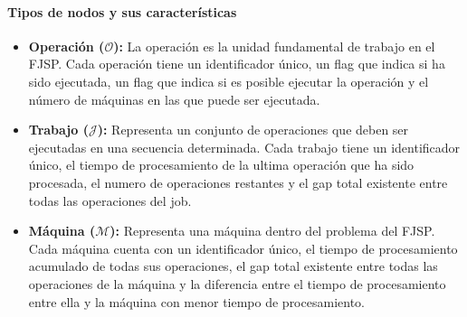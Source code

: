 \paragraph{Tipos de nodos y sus características}
\begin{itemize}
    \item \textbf{Operación ($\boldsymbol{\mathcal{O}}$):} La operación es la unidad fundamental de trabajo en el FJSP. Cada 
    operación tiene un identificador único, un flag que indica si ha sido ejecutada,
    un flag que indica si es posible ejecutar la operación y el número de máquinas en las que puede
    ser ejecutada.
    \item \textbf{Trabajo ($\boldsymbol{\mathcal{J}}$):} Representa un conjunto de operaciones que deben ser ejecutadas 
    en una secuencia determinada. Cada trabajo tiene un identificador único, el tiempo de 
    procesamiento de la ultima operación que ha sido procesada, el numero de operaciones restantes y el gap total
    existente entre todas las operaciones del job.
    \item \textbf{Máquina ($\boldsymbol{\mathcal{M}}$):} Representa una máquina dentro del problema del FJSP. Cada máquina 
    cuenta con un identificador único, el tiempo de procesamiento acumulado de todas sus operaciones,
    el gap total existente entre todas las operaciones de la máquina y la diferencia entre el tiempo
    de procesamiento entre ella y la máquina con menor tiempo de procesamiento.  
\end{itemize}

